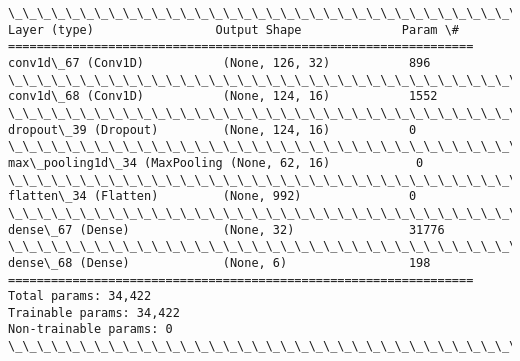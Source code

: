 \documentclass[11pt]{article}
\begin{document}
    \begin{Verbatim}[commandchars=\\\{\}]
\_\_\_\_\_\_\_\_\_\_\_\_\_\_\_\_\_\_\_\_\_\_\_\_\_\_\_\_\_\_\_\_\_\_\_\_\_\_\_\_\_\_\_\_\_\_\_\_\_\_\_\_\_\_\_\_\_\_\_\_\_\_\_\_\_
Layer (type)                 Output Shape              Param \#   
=================================================================
conv1d\_67 (Conv1D)           (None, 126, 32)           896       
\_\_\_\_\_\_\_\_\_\_\_\_\_\_\_\_\_\_\_\_\_\_\_\_\_\_\_\_\_\_\_\_\_\_\_\_\_\_\_\_\_\_\_\_\_\_\_\_\_\_\_\_\_\_\_\_\_\_\_\_\_\_\_\_\_
conv1d\_68 (Conv1D)           (None, 124, 16)           1552      
\_\_\_\_\_\_\_\_\_\_\_\_\_\_\_\_\_\_\_\_\_\_\_\_\_\_\_\_\_\_\_\_\_\_\_\_\_\_\_\_\_\_\_\_\_\_\_\_\_\_\_\_\_\_\_\_\_\_\_\_\_\_\_\_\_
dropout\_39 (Dropout)         (None, 124, 16)           0         
\_\_\_\_\_\_\_\_\_\_\_\_\_\_\_\_\_\_\_\_\_\_\_\_\_\_\_\_\_\_\_\_\_\_\_\_\_\_\_\_\_\_\_\_\_\_\_\_\_\_\_\_\_\_\_\_\_\_\_\_\_\_\_\_\_
max\_pooling1d\_34 (MaxPooling (None, 62, 16)            0         
\_\_\_\_\_\_\_\_\_\_\_\_\_\_\_\_\_\_\_\_\_\_\_\_\_\_\_\_\_\_\_\_\_\_\_\_\_\_\_\_\_\_\_\_\_\_\_\_\_\_\_\_\_\_\_\_\_\_\_\_\_\_\_\_\_
flatten\_34 (Flatten)         (None, 992)               0         
\_\_\_\_\_\_\_\_\_\_\_\_\_\_\_\_\_\_\_\_\_\_\_\_\_\_\_\_\_\_\_\_\_\_\_\_\_\_\_\_\_\_\_\_\_\_\_\_\_\_\_\_\_\_\_\_\_\_\_\_\_\_\_\_\_
dense\_67 (Dense)             (None, 32)                31776     
\_\_\_\_\_\_\_\_\_\_\_\_\_\_\_\_\_\_\_\_\_\_\_\_\_\_\_\_\_\_\_\_\_\_\_\_\_\_\_\_\_\_\_\_\_\_\_\_\_\_\_\_\_\_\_\_\_\_\_\_\_\_\_\_\_
dense\_68 (Dense)             (None, 6)                 198       
=================================================================
Total params: 34,422
Trainable params: 34,422
Non-trainable params: 0
\_\_\_\_\_\_\_\_\_\_\_\_\_\_\_\_\_\_\_\_\_\_\_\_\_\_\_\_\_\_\_\_\_\_\_\_\_\_\_\_\_\_\_\_\_\_\_\_\_\_\_\_\_\_\_\_\_\_\_\_\_\_\_\_\_

    \end{Verbatim}
\end{document}
